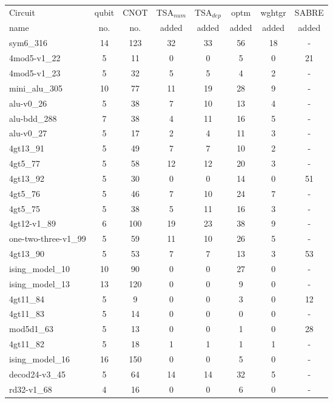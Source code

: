 \documentclass[journal]{IEEEtran}
\begin{document}
    \begin{table*}[htbp]
        \begin{center}  
        \begin{tabular}{|p{4.3cm}<{\centering}|c|c|c|c|c|c|c|}
        \hline
        Circuit &  qubit  & CNOT &TSA$_{num}$& TSA$_{dep}$  & optm 	 & wghtgr  &SABRE 	\\
         name	&   no. 	&	no. & added&  added &  added 	&  added &  added\\
        \hline
        sym6\_316 & 14 & 123 & 32 & 33 & 56 & 18 & - \\ 
4mod5-v1\_22 & 5 & 11 & 0 & 0 & 5 & 0 & 21 \\ 
4mod5-v1\_23 & 5 & 32 & 5 & 5 & 4 & 2 & - \\ 
mini\_alu\_305 & 10 & 77 & 11 & 19 & 28 & 9 & - \\ 
alu-v0\_26 & 5 & 38 & 7 & 10 & 13 & 4 & - \\ 
alu-bdd\_288 & 7 & 38 & 4 & 11 & 16 & 5 & - \\ 
alu-v0\_27 & 5 & 17 & 2 & 4 & 11 & 3 & - \\ 
4gt13\_91 & 5 & 49 & 7 & 7 & 10 & 2 & - \\ 
4gt5\_77 & 5 & 58 & 12 & 12 & 20 & 3 & - \\ 
4gt13\_92 & 5 & 30 & 0 & 0 & 14 & 0 & 51 \\ 
4gt5\_76 & 5 & 46 & 7 & 10 & 24 & 7 & - \\ 
4gt5\_75 & 5 & 38 & 5 & 11 & 16 & 3 & - \\ 
4gt12-v1\_89 & 6 & 100 & 19 & 23 & 38 & 9 & - \\ 
one-two-three-v1\_99 & 5 & 59 & 11 & 10 & 26 & 5 & - \\ 
4gt13\_90 & 5 & 53 & 7 & 7 & 13 & 3 & 53 \\ 
ising\_model\_10 & 10 & 90 & 0 & 0 & 27 & 0 & - \\ 
ising\_model\_13 & 13 & 120 & 0 & 0 & 9 & 0 & - \\ 
4gt11\_84 & 5 & 9 & 0 & 0 & 3 & 0 & 12 \\ 
4gt11\_83 & 5 & 14 & 0 & 0 & 0 & 0 & - \\ 
mod5d1\_63 & 5 & 13 & 0 & 0 & 1 & 0 & 28 \\ 
4gt11\_82 & 5 & 18 & 1 & 1 & 1 & 1 & - \\ 
ising\_model\_16 & 16 & 150 & 0 & 0 & 5 & 0 & - \\ 
decod24-v3\_45 & 5 & 64 & 14 & 14 & 32 & 5 & - \\ 
rd32-v1\_68 & 4 & 16 & 0 & 0 & 6 & 0 & - \\ 

\end{tabular}
\end{center}
\end{table*}
\end{document}
